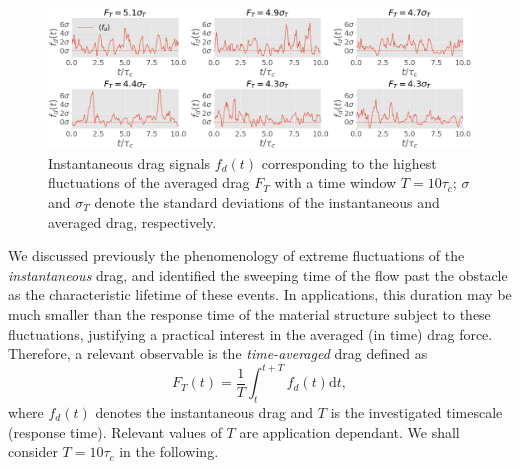 \documentclass[pre,aps,floatfix,10pt,superscriptaddress, notitlepage,preprint]{revtex4-1}
\begin{document}
\begin{figure}
	\centering
	\includegraphics[width=\linewidth]{timeseries_extrms_AVG/timeseries_extrms_AVG}
	\caption{Instantaneous drag signals $f_d(t)$ corresponding to the highest fluctuations of the averaged  drag $F_T$ with a time window $T = 10 \tau_c$;  $\sigma$ and $\sigma_T$ denote the standard deviations of the instantaneous and averaged drag, respectively.}
	\label{fig:extreme_avg}
\end{figure}


%

We discussed previously the phenomenology of extreme fluctuations of the \emph{instantaneous} drag, and identified the sweeping time of the flow past the obstacle as the characteristic lifetime of these events. 
%
In applications, this duration may be much smaller than the response time of the material structure subject to these fluctuations, justifying a practical interest in the averaged (in time) drag force. 
%
%
Therefore, a relevant observable is the \textit{time-averaged} drag defined as
\begin{equation}
  \label{eq:def_time_averaged_drag}
  F_T(t) = \frac{1}{T}\int_t^{t+T} f_d(t) \mathrm{d}t,
\end{equation}
where $f_d(t)$ denotes the instantaneous drag and $T$ is the investigated timescale (response time).
Relevant values of $T$ are application dependant.
We shall consider $T=10\tau_c$ in the following.
\end{document}
